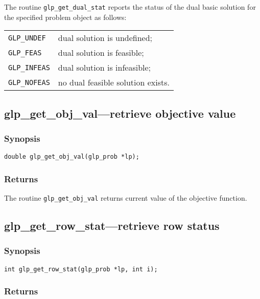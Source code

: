 The routine \verb|glp_get_dual_stat| reports the status of the dual
basic solution for the specified problem object as follows:

\begin{tabular}{@{}ll}
\verb|GLP_UNDEF|  & dual solution is undefined; \\
\verb|GLP_FEAS|   & dual solution is feasible; \\
\verb|GLP_INFEAS| & dual solution is infeasible; \\
\verb|GLP_NOFEAS| & no dual feasible solution exists. \\
\end{tabular}

\subsection{glp\_get\_obj\_val---retrieve objective value}

\subsubsection*{Synopsis}

\begin{verbatim}
double glp_get_obj_val(glp_prob *lp);
\end{verbatim}

\subsubsection*{Returns}

The routine \verb|glp_get_obj_val| returns current value of the
objective function.

\subsection{glp\_get\_row\_stat---retrieve row status}

\subsubsection*{Synopsis}

\begin{verbatim}
int glp_get_row_stat(glp_prob *lp, int i);
\end{verbatim}

\subsubsection*{Returns}

